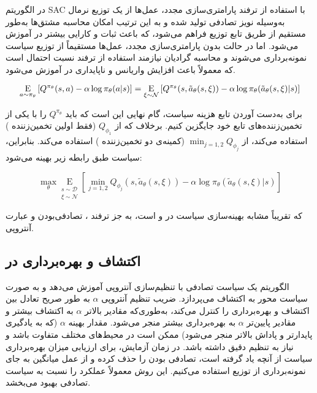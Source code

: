 در الگوریتم SAC با استفاده از ترفند پارامتری‌سازی مجدد، عمل‌ها از یک توزیع نرمال به‌وسیله نویز تصادفی تولید شده و به این ترتیب امکان محاسبه مشتق‌ها به‌طور مستقیم از طریق تابع توزیع فراهم می‌شود، که باعث ثبات و کارایی بیشتر در آموزش می‌شود. اما در حالت بدون پارامتری‌سازی مجدد، عمل‌ها مستقیماً از توزیع سیاست نمونه‌برداری می‌شوند و محاسبه گرادیان نیازمند استفاده از ترفند نسبت احتمال است که معمولاً باعث افزایش واریانس و ناپایداری در آموزش می‌شود.

\begin{equation}
	\underset{a \sim \pi_{\theta}}{\mathrm{E}}\left[
	{Q^{\pi_{\theta}}(s,a) - \alpha \log \pi_{\theta}(a|s)} 
	\right]= \underset{\xi \sim \mathcal{N}}{\mathrm{E}}\left[
	{Q^{\pi_{\theta}}(s,\tilde{a}_{\theta}(s,\xi)) - \alpha \log \pi_{\theta}(\tilde{a}_{\theta}(s,\xi)|s)}
	\right]
\end{equation}

برای به‌دست آوردن تابع هزینه سیاست، گام نهایی این است که باید \( Q^{\pi_{\theta}} \) را با یکی از تخمین‌زننده‌های تابع خود جایگزین کنیم. برخلاف  که از \( Q_{\phi_1} \) (فقط اولین تخمین‌زننده ) استفاده می‌کند،  از \( \min_{j=1,2} Q_{\phi_j} \) (کمینه‌ی دو تخمین‌زننده ) استفاده می‌کند. بنابراین، سیاست طبق رابطه زیر بهینه می‌شود:


\begin{equation}
	\max_{\theta}
	\underset{\substack{s \sim \mathcal{D} \\ \xi \sim \mathcal{N}}}{\mathrm{E}} 
	\left[
	{\min_{j=1,2} Q_{\phi_j}(s,\tilde{a}_{\theta}(s,\xi)) - \alpha \log \pi_{\theta}(\tilde{a}_{\theta}(s,\xi)|s)}
	\right]
\end{equation}

که تقریباً مشابه بهینه‌سازی سیاست در  و  است، به جز ترفند ، تصادفی‌بودن و عبارت آنتروپی.

\subsection{اکتشاف و بهره‌برداری در }

الگوریتم  یک سیاست تصادفی با تنظیم‌سازی آنتروپی آموزش می‌دهد و به صورت سیاست محور به اکتشاف می‌پردازد. ضریب تنظیم آنتروپی \( \alpha \) به طور صریح تعادل بین اکتشاف و بهره‌برداری را کنترل می‌کند، به‌طوری‌که مقادیر بالاتر \( \alpha \) به اکتشاف بیشتر و مقادیر پایین‌تر \( \alpha \) به بهره‌برداری بیشتر منجر می‌شود. مقدار بهینه \( \alpha \) (که به یادگیری پایدارتر و پاداش بالاتر منجر می‌شود) ممکن است در محیط‌های مختلف متفاوت باشد و نیاز به تنظیم دقیق داشته باشد.
در زمان آزمایش، برای ارزیابی میزان بهره‌برداری سیاست از آنچه یاد گرفته است، تصادفی بودن را حذف کرده و از عمل میانگین به جای نمونه‌برداری از توزیع استفاده می‌کنیم. این روش معمولاً عملکرد را نسبت به سیاست تصادفی  بهبود می‌بخشد.



